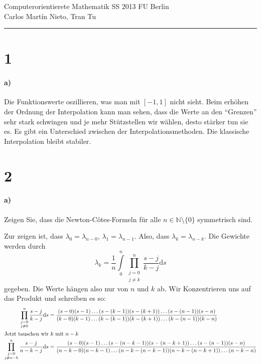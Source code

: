 \documentclass[ngerman,a4paper]{scrartcl}
\newcommand{\N}{\ensuremath{\mathbb{N}}}
\begin{document}
{\sffamily
  \hfill
  Computerorientierete Mathematik SS 2013\hfill
  FU Berlin\\[8pt]
  \hfill Carlos Martín Nieto, Tran Tu\hrule \bigskip
}

\section*{1}

\paragraph{a)}

Die Funktionswerte oszillieren, was man mit $[-1,1]$ nicht sieht. Beim
erhöhen der Ordnung der Interpolation kann man sehen, dass die Werte
an den "`Grenzen"' sehr stark schwingen und je mehr Stützstellen wir
wählen, desto stärker tun sie es. Es gibt ein Unterschied zwischen der
Interpolationsmethoden. Die klassische Interpolation bleibt stabiler.

\section*{2}

\paragraph{a)}

Zeigen Sie, dass die Newton-Côtes-Formeln für alle
$n\in\N\setminus\{0\}$ symmetrisch sind.

Zur zeigen ist, dass $\lambda_0 = \lambda_{n-0}$, $\lambda_1 =
\lambda_{n-1}$. Also, dass $\lambda_k = \lambda_{n-k}$. Die Gewichte
werden durch
\[
\lambda_k = \frac{1}{n} \int\limits^n_0\prod^n_{\substack{j=0\\j\neq k}} \frac{s-j}{k-j}\text{d}s
\]
gegeben. Die Werte hängen also nur von $n$ und $k$ ab. Wir
Konzentrieren uns auf das Produkt und schreiben es so:
\begin{align*}
  \prod^n_{\substack{j=0\\j\neq k}} \frac{s-j}{k-j}\text{d}s &= \frac{(s-0)(s-1)\dots(s-(k-1))(s-(k+1))\dots(s-(n-1))(s-n)}
  {(k-0)(k-1)\dots(k-(k-1))(k-(k+1))\dots(k-(n-1))(k-n)}\\
  \intertext{Jetzt tauschen wir $k$ mit $n-k$}
  \prod^n_{\substack{j=0\\j\neq n-k}} \frac{s-j}{n-k-j}\text{d}s &= \frac{(s-0)(s-1)\dots(s-(n-k-1))(s-(n-k+1))\dots(s-(n-1))(s-n)}
  {(n-k-0)(n-k-1)\dots(n-k-(n-k-1))(n-k-(n-k+1))\dots(n-k-n)}
\end{align*}
\end{document}
